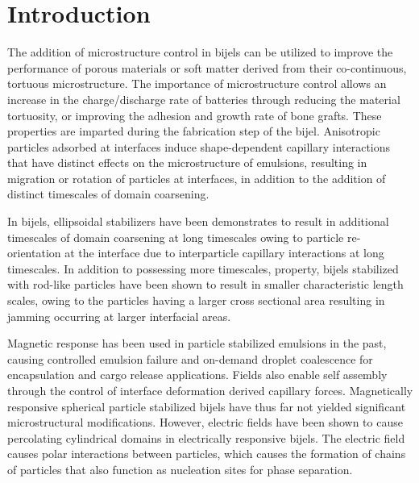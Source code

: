 \section{Introduction}

The addition of microstructure control in bijels can be utilized to improve the performance of porous materials
or soft matter derived from their co-continuous, tortuous microstructure. The importance of microstructure control
allows an increase in the charge/discharge rate of batteries through reducing the material tortuosity, or improving the 
adhesion and growth rate of bone grafts. These properties are imparted during the fabrication step of the bijel. Anisotropic
particles adsorbed at interfaces induce shape-dependent capillary interactions that have distinct effects on the
microstructure of emulsions, resulting in migration or rotation of particles at interfaces, in addition to the addition of
distinct timescales of domain coarsening. \cite{loudet_capillary_2005, cavallaro_curvature-driven_2011, gunther_lattice_2013}

In bijels, ellipsoidal stabilizers have been demonstrates to result in additional timescales of domain coarsening 
at long timescales owing to particle re-orientation at the interface due to interparticle capillary interactions 
at long timescales. \cite{gunther_timescales_2014} In addition to possessing more timescales, property, bijels stabilized 
with rod-like particles have been shown to result in smaller characteristic length scales, owing to the particles having a
larger cross sectional area resulting in jamming occurring at larger interfacial areas. \cite{hijnen_bijels_2015} 

Magnetic response has been used in particle stabilized emulsions in the past, causing controlled emulsion failure and
on-demand droplet coalescence for encapsulation and cargo release applications. \cite{melle_pickering_2005, zhou_magnetic_2011}
Fields also enable self assembly through the control of interface deformation derived capillary forces.
\cite{morgan_understanding_2013,davies_interface_2014,davies_dipolar_2015} Magnetically responsive spherical particle 
stabilized bijels have thus far not yielded significant microstructural modifications. \cite{kim_bijels_2010} However, 
electric fields have been shown to cause percolating cylindrical domains in electrically responsive bijels. \cite{carmack_tuning_2018}
The electric field causes polar interactions between particles, which causes the formation of chains of particles that
also function as nucleation sites for phase separation. \cite{carmack_tuning_2018}

